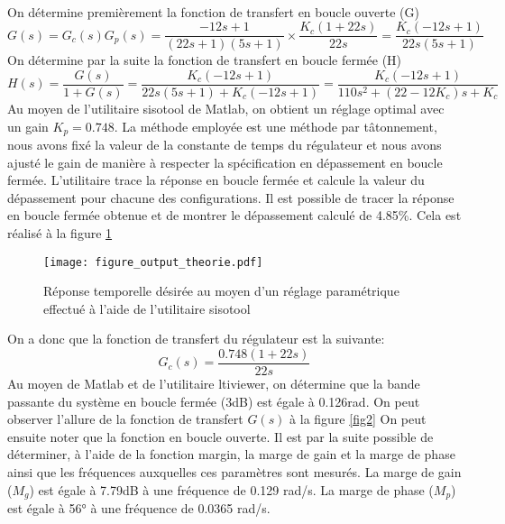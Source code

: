 \paragraph{} On détermine premièrement la fonction de transfert en boucle ouverte (G)
\begin{equation}
G(s) = G_c(s) G_p(s) =  \frac{-12s + 1}{(22s +1)(5s+1)} \times \frac{K_c (1 + 22s)}{22s} = \frac{K_c(-12s + 1)}{22s(5s + 1)}
\end{equation}
On détermine par la suite la fonction de transfert en boucle fermée (H)
\begin{equation}
H(s) = \frac{G(s)}{1 + G(s)} = \frac{K_c(-12s + 1)}{22s(5s+1) + K_c(-12s + 1)} = \frac{K_c(-12s + 1)}{110s^2 + (22 - 12K_c)s + K_c}
\end{equation} 
Au moyen de l'utilitaire sisotool de Matlab, on obtient un réglage optimal avec un gain $K_p = 0.748$. La méthode employée est une méthode par tâtonnement, nous avons fixé la valeur de la constante de temps du régulateur et nous avons ajusté le gain de manière à respecter la spécification en dépassement en boucle fermée. L'utilitaire trace la réponse en boucle fermée et calcule la valeur du dépassement pour chacune des configurations. Il est possible de tracer la réponse en boucle fermée obtenue et de montrer le dépassement calculé de 4.85\%. Cela est réalisé à la figure \ref{fig1}
\begin{figure}[htbp]
\centering
\texttt{[image: figure\_output\_theorie.pdf]}
\caption{Réponse temporelle désirée au moyen d'un réglage paramétrique effectué à l'aide de l'utilitaire sisotool}
\label{fig1}
\end{figure}
On a donc que la fonction de transfert du régulateur est la suivante:
\begin{equation}
G_c(s) = \frac{0.748(1 + 22s)}{22s}
\end{equation} 
Au moyen de Matlab et de l'utilitaire ltiviewer, on détermine que la bande passante du système en boucle fermée (3dB) est égale à 0.126rad. On peut observer l'allure de la fonction de transfert $G(s)$ à la figure \ref{fig2} On peut ensuite noter que la fonction en boucle ouverte. Il est par la suite possible de déterminer, à l'aide de la fonction margin, la marge de gain et la marge de phase ainsi que les fréquences auxquelles ces paramètres sont mesurés. La marge de gain ($M_g$) est égale à 7.79dB à une fréquence de 0.129 rad/s. La marge de phase ($M_p$) est égale à 56° à une fréquence de 0.0365 rad/s.
